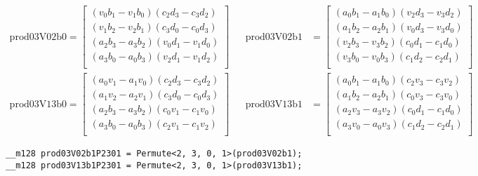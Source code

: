 \documentclass[fontsize = 10pt,DIV = 13]{scrartcl}
\newcommand{\pth}[1]{\left(#1\right)}
\begin{document}
\begin{align*}
\mathrm{prod03V02b0} 
=
\begin{bmatrix}
\pth{v_0b_1 - v_1b_0}\pth{c_2d_3 - c_3d_2}\\
\pth{v_1b_2 - v_2b_1}\pth{c_3d_0 - c_0d_3}\\
\pth{a_2b_3 - a_3b_2}\pth{v_0d_1 - v_1d_0}\\
\pth{a_3b_0 - a_0b_3}\pth{v_2d_1 - v_1d_2}\\
\end{bmatrix}
&&
\mathrm{prod03V02b1} 
&=
\begin{bmatrix}
\pth{a_0b_1 - a_1b_0}\pth{v_2d_3 - v_3d_2}\\
\pth{a_1b_2 - a_2b_1}\pth{v_0d_3 - v_3d_0}\\
\pth{v_2b_3 - v_3b_2}\pth{c_0d_1 - c_1d_0}\\
\pth{v_3b_0 - v_0b_3}\pth{c_1d_2 - c_2d_1}\\
\end{bmatrix}
\\
\mathrm{prod03V13b0} 
=
\begin{bmatrix}
\pth{a_0v_1 - a_1v_0}\pth{c_2d_3 - c_3d_2}\\
\pth{a_1v_2 - a_2v_1}\pth{c_3d_0 - c_0d_3}\\
\pth{a_2b_3 - a_3b_2}\pth{c_0v_1 - c_1v_0}\\
\pth{a_3b_0 - a_0b_3}\pth{c_2v_1 - c_1v_2}\\
\end{bmatrix}
&&
\mathrm{prod03V13b1} 
&=
\begin{bmatrix}
\pth{a_0b_1 - a_1b_0}\pth{c_2v_3 - c_3v_2}\\
\pth{a_1b_2 - a_2b_1}\pth{c_0v_3 - c_3v_0}\\
\pth{a_2v_3 - a_3v_2}\pth{c_0d_1 - c_1d_0}\\
\pth{a_3v_0 - a_0v_3}\pth{c_1d_2 - c_2d_1}\\
\end{bmatrix}
\end{align*}


\begin{verbatim}
__m128 prod03V02b1P2301 = Permute<2, 3, 0, 1>(prod03V02b1);
__m128 prod03V13b1P2301 = Permute<2, 3, 0, 1>(prod03V13b1);
\end{verbatim}
\end{document}
